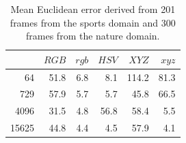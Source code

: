 \documentclass[11pt]{article}
\begin{document}
\begin{table}[h!]
\centering
\begin{tabular}{r||r|r|r|r|r}
	      & $RGB$ & $rgb$ & $HSV$ & $XYZ$ & $xyz$ \\ \hline \hline
	   64 &  51.8 &   6.8 &   8.1 & 114.2 &  81.3 \\ \hline
	  729 &  57.9 &   5.7 &   5.7 &  45.8 &  66.5 \\ \hline
	 4096 &  31.5 &   4.8 &  56.8 &  58.4 &   5.5 \\ \hline
	15625 &  44.8 &   4.4 &   4.5 &  57.9 &   4.1 \\ \hline
\end{tabular}
\caption{Mean Euclidean error derived from 201 frames from the sports domain and
300 frames from the nature domain.}
\label{tbl:error}
\end{table}
\end{document}
